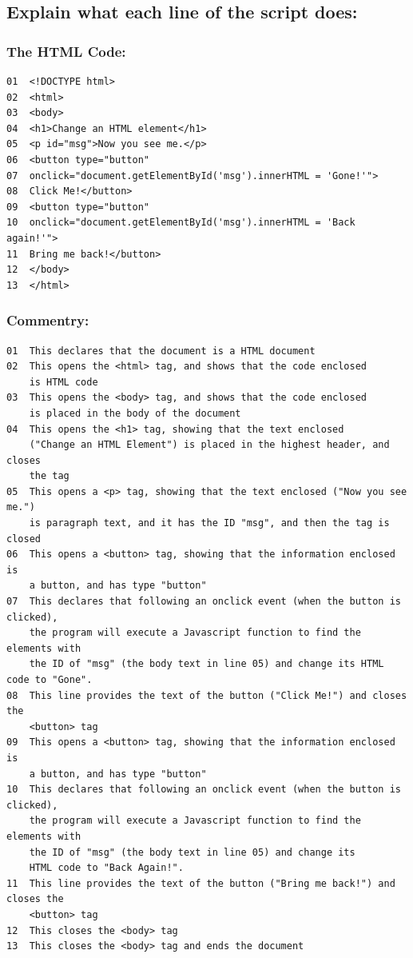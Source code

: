 \documentclass[a4paper]{article}
\begin{document}
\subsection{Explain what each line of the script does:}
\subsubsection{The HTML Code:}
\begin{lstlisting}
01	<!DOCTYPE html>
02	<html>
03	<body>
04	<h1>Change an HTML element</h1>
05	<p id="msg">Now you see me.</p>
06	<button type="button"
07	onclick="document.getElementById('msg').innerHTML = 'Gone!'">
08	Click Me!</button>
09	<button type="button"
10	onclick="document.getElementById('msg').innerHTML = 'Back again!'">
11	Bring me back!</button>
12	</body>
13	</html>
\end{lstlisting}
\subsubsection{Commentry:}
\begin{lstlisting}
01	This declares that the document is a HTML document
02	This opens the <html> tag, and shows that the code enclosed 
	is HTML code
03	This opens the <body> tag, and shows that the code enclosed 
	is placed in the body of the document
04	This opens the <h1> tag, showing that the text enclosed 
	("Change an HTML Element") is placed in the highest header, and closes
	the tag
05	This opens a <p> tag, showing that the text enclosed ("Now you see me.")
	is paragraph text, and it has the ID "msg", and then the tag is closed
06	This opens a <button> tag, showing that the information enclosed is 
	a button, and has type "button"
07	This declares that following an onclick event (when the button is clicked),
	the program will execute a Javascript function to find the elements with 
	the ID of "msg" (the body text in line 05) and change its HTML code to "Gone".
08	This line provides the text of the button ("Click Me!") and closes the 
	<button> tag
09	This opens a <button> tag, showing that the information enclosed is 
	a button, and has type "button"
10	This declares that following an onclick event (when the button is clicked),
	the program will execute a Javascript function to find the elements with 
	the ID of "msg" (the body text in line 05) and change its 
	HTML code to "Back Again!".
11	This line provides the text of the button ("Bring me back!") and closes the 
	<button> tag
12	This closes the <body> tag
13	This closes the <body> tag and ends the document
\end{lstlisting}
\newpage
\end{document}
